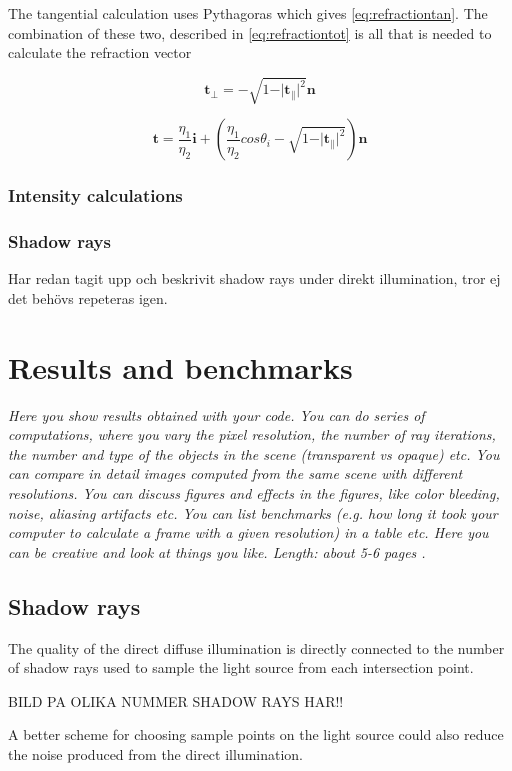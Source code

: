 \documentclass[]{report}   %
\begin{document}
The tangential calculation uses Pythagoras which gives \autoref{eq:refractiontan}. The combination of these two, described in \autoref{eq:refractiontot} is all that is needed to calculate the refraction vector 

\begin{equation} \label{eq:refractiontan}
\mathbf{t}_\bot = - \sqrt{1 - \vert \mathbf{t}_\| \vert ^2}\mathbf{n}
\end{equation}

\begin{equation} \label{eq:refractiontot}
\mathbf{t} = \frac{\eta_1}{\eta_2} \mathbf{i} + (\frac{\eta_1}{\eta_2} cos \theta_i - \sqrt{1 - \vert \mathbf{t}_\| \vert ^2})\mathbf{n}
\end{equation}

\subsection{Intensity calculations}
\subsection{Shadow rays}
Har redan tagit upp och beskrivit shadow rays under direkt illumination, tror ej det behövs repeteras igen.
\chapter{Results and benchmarks}
\emph{Here you show results obtained with your code. 
You can do series of computations, where you vary the pixel resolution, the number of ray iterations, the number and type of the objects in the scene (transparent vs opaque) etc. 
You can compare in detail images computed from the same scene with different resolutions. 
You can discuss figures and effects in the figures, like color bleeding, noise, aliasing artifacts etc. 
You can list benchmarks (e.g. how long it took your computer to calculate a frame with a given resolution) in a table etc. 
Here you can be creative and look at things you like. 
Length: about 5-6 pages .}
\section{Shadow rays}
The quality of the direct diffuse illumination is directly connected to the number of shadow rays used to sample the light source from each intersection point.

BILD PA OLIKA NUMMER SHADOW RAYS HAR!!

A better scheme for choosing sample points on the light source could also reduce the noise produced from the direct illumination.
\end{document}
